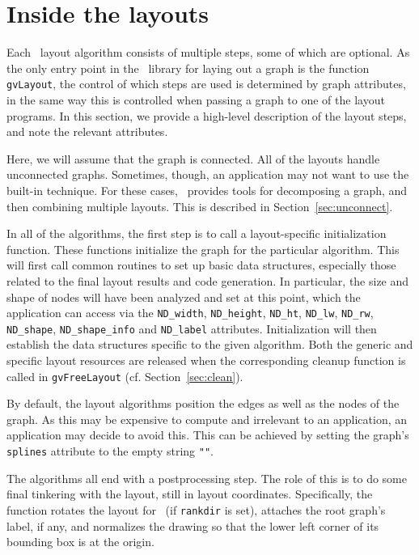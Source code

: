 \section{Inside the layouts}
\label{sec:layouts}

Each \gviz\ layout algorithm consists of multiple steps, some of
which are optional.
As the only entry point in the \gviz\ library for laying out
a graph is the function {\tt gvLayout}, the control of which
steps are used is determined by graph attributes, in the same
way this is controlled when passing a graph to one of the layout
programs. In this section, we provide a high-level description
of the layout steps, and note the relevant attributes.

Here, we will assume that the graph is connected. 
All of the layouts handle unconnected graphs. Sometimes, though,
an application may not want to use the built-in
technique. For these cases, \gviz\ provides tools for 
decomposing a graph, and then
combining multiple layouts. This is described in Section~\ref{sec:unconnect}.

In all of the algorithms, the first step is to call a layout-specific
initialization function. These functions 
initialize the graph for the particular algorithm.
This will first call common routines to set up basic data structures,
especially those related to the final layout results and
code generation. In particular, the size and shape of nodes will
have been analyzed and set at this point, which the application
can access via the {\tt ND\_width}, {\tt ND\_height}, 
{\tt ND\_ht}, {\tt ND\_lw}, 
{\tt ND\_rw}, {\tt ND\_shape}, {\tt ND\_shape\_info}
and {\tt ND\_label} attributes.
Initialization will then establish the data
structures specific to the given algorithm. Both the generic
and specific layout resources are released when the corresponding
cleanup function is called in {\tt gvFreeLayout} (cf. Section~\ref{sec:clean}).

By default, the layout algorithms position the edges as well as the
nodes of the graph. As this may be expensive to compute and irrelevant 
to an application, an application may decide to avoid this. This can
be achieved by setting the graph's {\tt splines} attribute to the
empty string {\tt ""}.

The algorithms all end with a postprocessing step.
The role of this is to do some final tinkering with the
layout, still in layout coordinates. Specifically, the function
rotates the layout for \dot\ (if {\tt rankdir} is set),
attaches the root graph's label, if any, and normalizes the drawing
so that the lower left corner of its bounding box is at the origin.

